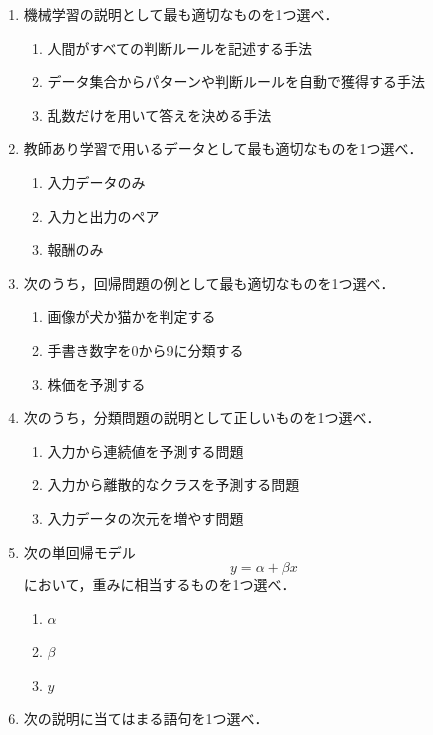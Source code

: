 \documentclass[uplatex,a4paper,12pt]{jsarticle}
\begin{document}
\begin{enumerate}

\item 機械学習の説明として最も適切なものを1つ選べ．
\begin{enumerate}[label=(\alph*)]
\item 人間がすべての判断ルールを記述する手法
\item データ集合からパターンや判断ルールを自動で獲得する手法
\item 乱数だけを用いて答えを決める手法
\end{enumerate}

\item 教師あり学習で用いるデータとして最も適切なものを1つ選べ．
\begin{enumerate}[label=(\alph*)]
\item 入力データのみ
\item 入力と出力のペア
\item 報酬のみ
\end{enumerate}

\item 次のうち，回帰問題の例として最も適切なものを1つ選べ．
\begin{enumerate}[label=(\alph*)]
\item 画像が犬か猫かを判定する
\item 手書き数字を0から9に分類する
\item 株価を予測する
\end{enumerate}

\item 次のうち，分類問題の説明として正しいものを1つ選べ．
\begin{enumerate}[label=(\alph*)]
\item 入力から連続値を予測する問題
\item 入力から離散的なクラスを予測する問題
\item 入力データの次元を増やす問題
\end{enumerate}

\item 次の単回帰モデル
\[
y=\alpha+\beta x
\]
において，重みに相当するものを1つ選べ．
\begin{enumerate}[label=(\alph*)]
\item $\alpha$
\item $\beta$
\item $y$
\end{enumerate}

\item 次の説明に当てはまる語句を1つ選べ．


\end{enumerate}
\end{document}
